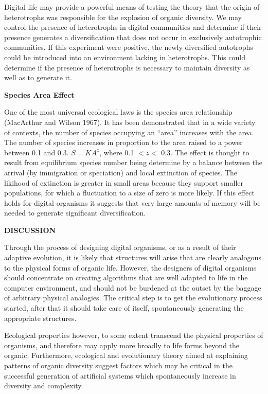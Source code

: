 Digital life may provide a powerful means of testing the theory that the
origin of heterotrophs was responsible for the explosion of organic
diversity.  We may control the presence of heterotrophs in digital
communities and determine if their presence generates a diversification
that does not occur in exclusively autotrophic communities.  If this
experiment were positive, the newly diversified autotrophs could be
introduced into an environment lacking in heterotrophs.  This could
determine if the presence of heterotrophs is necessary to maintain
diversity as well as to generate it.

\LP
\bf Species Area Effect\rm
\eLP

One of the most universal ecological laws is the species area relationship
(MacArthur and Wilson 1967).
It has been demonstrated that in a wide variety of contexts, the number of
species occupying an ``area'' increases with the area.  The number of
species increases in proportion to the area raised to a power between 0.1
and 0.3.  $S = KA^{z}$, where 0.1 $< z <$ 0.3.  The effect is thought to
result from equilibrium species number being determine by a balance between
the arrival (by immigration or speciation) and local extinction of species.
The likihood of extinction is greater in small areas because they support
smaller populations, for which a fluctuation to a size of zero is more
likely.  If this effect holds for digital organisms it suggests that very
large amounts of memory will be needed to generate significant
diversification.

\LP
\bf DISCUSSION\rm
\eLP

Through the process of designing digital organisms, or as a result of their
adaptive evolution, it is likely that structures will arise that are
clearly analogous to the physical forms of organic life.  However, the
designers of digital organisms should concentrate on creating algorithms
that are well adapted to life in the computer environment, and should
not be burdened at the outset by the baggage of arbitrary physical
analogies.  The critical step is to get the
evolutionary process started, after that it should take care of itself,
spontaneously generating the appropriate structures.

Ecological properties however, to some extent transcend the physical
properties of organisms, and therefore may apply more broadly to life
forms beyond the organic.  Furthermore, ecological and evolutionary
theory aimed at explaining patterns of organic diversity suggest factors
which may be critical in the successful generation of artificial
systems which spontaneously increase in diversity and complexity.

